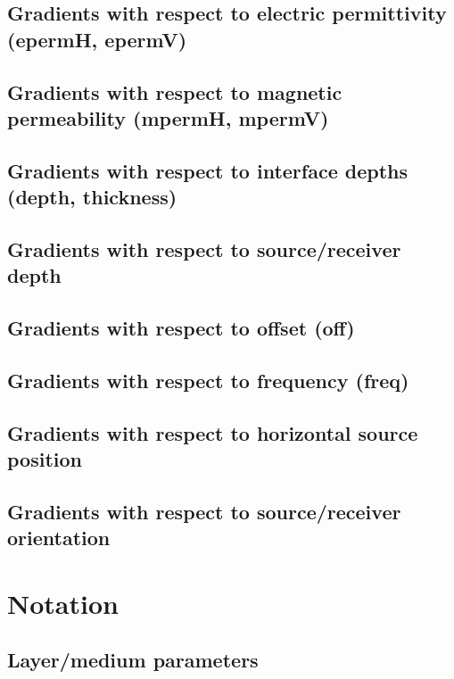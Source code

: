 \documentclass[12pt]{report}
\begin{document}
\section{Gradients with respect to electric permittivity (epermH, epermV)}

\section{Gradients with respect to magnetic permeability (mpermH, mpermV)}

\section{Gradients with respect to interface depths (depth, thickness)}

\section{Gradients with respect to source/receiver depth}

\section{Gradients with respect to offset (off)}

\section{Gradients with respect to frequency (freq)}

\section{Gradients with respect to horizontal source position}

\section{Gradients with respect to source/receiver orientation}

\appendix
\chapter{Notation}
\label{app:notation}

\section{Layer/medium parameters}
\end{document}
